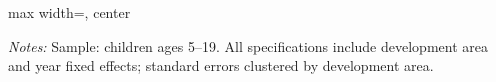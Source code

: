 \documentclass[12pt]{article}
\newcommand*{\TableLagTwoPath}{../Paper_3_Tables/Lagged_2Year_Tables}
\begin{document}
	\begin{table}[H]
	\centering
	\begin{adjustbox}{max width=\linewidth, center}
	\begin{threeparttable}
		\caption{Skills Program Enrollment and Completion, IV Estimates (Lag 2)}
		\label{tab:skills_lag2}
		{\small}
		\begin{tablenotes}
			\small
			\item \textit{Notes:} Sample: children ages 5--19. All specifications include development area and year fixed effects; standard errors clustered by development area.
		\end{tablenotes}
	\end{threeparttable}
	\end{adjustbox}
	\end{table}

	\FloatBarrier
\end{document}
